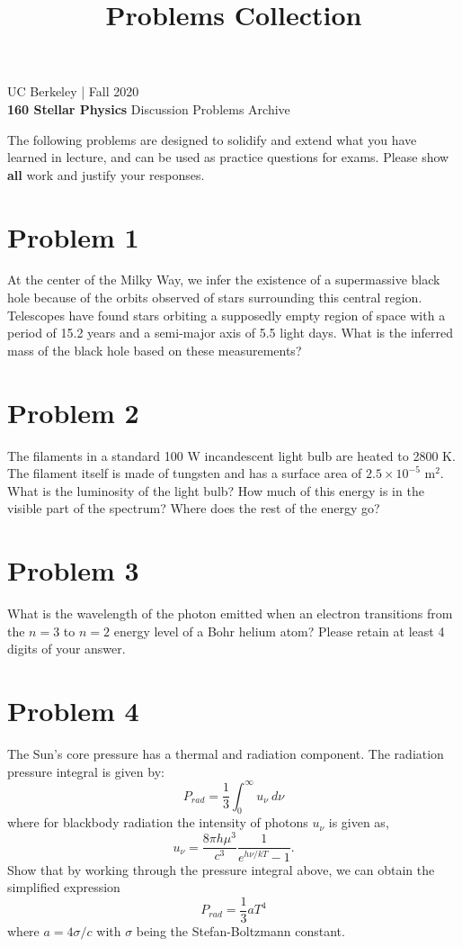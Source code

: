 \documentclass[12pt]{article}
\title{Problems Collection}
\begin{document}
UC Berkeley | Fall 2020 \\
\textbf{160 Stellar Physics} Discussion \hfill Problems Archive
\vspace{-0.5cm}

\hrulefill

The following problems are designed to solidify and extend what you have learned in lecture, and can be used as practice questions for exams. Please show \textbf{all} work and justify your responses.

\section*{Problem 1}
At the center of the Milky Way, we infer the existence of a supermassive black hole because of the orbits observed of stars surrounding this central region. Telescopes have found stars orbiting a supposedly empty region of space with a period of 15.2 years and a semi-major axis of 5.5 light days. What is the inferred mass of the black hole based on these measurements?



\section*{Problem 2}
The filaments in a standard 100 W incandescent light bulb are heated to 2800 K. The filament itself is made of tungsten and has a surface area of $2.5 \times 10^{-5}$ m$^2$. What is the luminosity of the light bulb? How much of this energy is in the visible part of the spectrum? Where does the rest of the energy go?


\section*{Problem 3}
What is the wavelength of the photon emitted when an electron transitions from the $n = 3$ to $n = 2$ energy level of a Bohr helium atom? Please retain at least 4 digits of your answer.


\section*{Problem 4}
The Sun's core pressure has a thermal and radiation component. The radiation pressure integral is given by:
\begin{equation*}
P_{rad} = \frac{1}{3} \int_{0}^{\infty} u_{\nu} ~d\nu
\end{equation*}
where for blackbody radiation the intensity of photons $u_{\nu}$ is given as,
\begin{equation*}
u_{\nu} = \frac{8\pi h\mu^3}{c^3}\frac{1}{e^{h\nu /kT}-1}.
\end{equation*}
Show that by working through the pressure integral above, we can obtain the simplified expression 
\begin{equation*}
P_{rad} = \frac{1}{3}aT^4
\end{equation*}
where $a = 4\sigma/c$ with $\sigma$ being the Stefan-Boltzmann constant.
\end{document}
